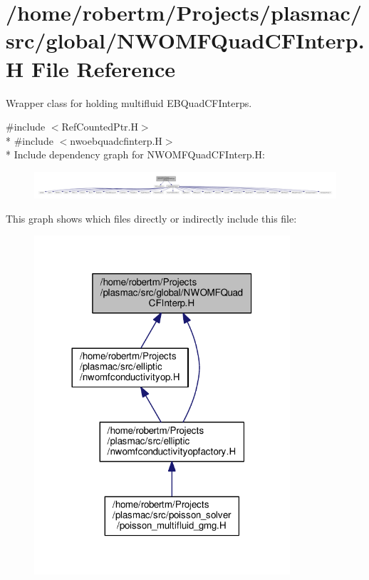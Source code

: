\hypertarget{NWOMFQuadCFInterp_8H}{}\section{/home/robertm/\+Projects/plasmac/src/global/\+N\+W\+O\+M\+F\+Quad\+C\+F\+Interp.H File Reference}
\label{NWOMFQuadCFInterp_8H}


Wrapper class for holding multifluid E\+B\+Quad\+C\+F\+Interps.  


{\ttfamily \#include $<$Ref\+Counted\+Ptr.\+H$>$}\\*
{\ttfamily \#include $<$nwoebquadcfinterp.\+H$>$}\\*
Include dependency graph for N\+W\+O\+M\+F\+Quad\+C\+F\+Interp.\+H\+:\nopagebreak
\begin{figure}[H]
\begin{center}
\leavevmode
\includegraphics[width=350pt]{NWOMFQuadCFInterp_8H__incl}
\end{center}
\end{figure}
This graph shows which files directly or indirectly include this file\+:\nopagebreak
\begin{figure}[H]
\begin{center}
\leavevmode
\includegraphics[width=269pt]{NWOMFQuadCFInterp_8H__dep__incl}
\end{center}
\end{figure}
